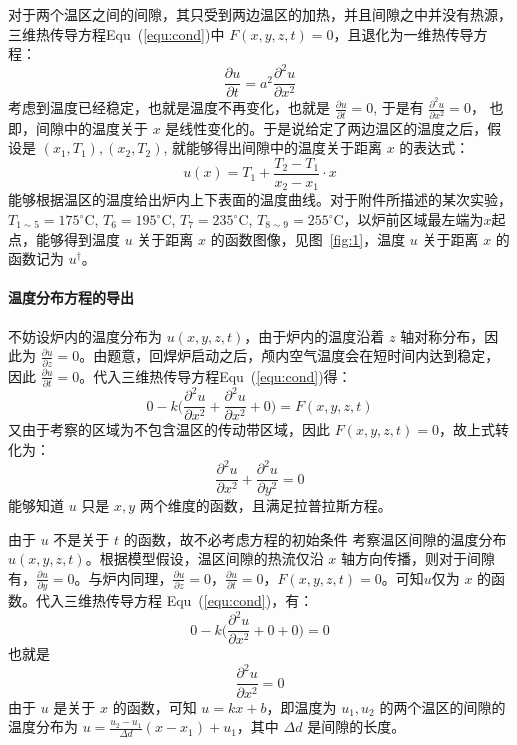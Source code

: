 \documentclass[../main.tex]{subfiles}
\begin{document}
对于两个温区之间的间隙，其只受到两边温区的加热，并且间隙之中并没有热源，三维热传导方程Equ~(\ref{equ:cond})中 \(F ( x , y , z ,t) = 0\)，且退化为一维热传导方程：
\begin{equation}
\frac{\partial u}{\partial t} = a^{2} \frac{\partial ^{2} u}{ \partial x ^{2}}
\end{equation}
考虑到温度已经稳定，也就是温度不再变化，也就是 \(\frac{\partial u}{ \partial t} = 0\), 于是有 \(\frac{\partial ^{2} u}{\partial x ^{2}} = 0 \)，
也即，间隙中的温度关于 \(x\) 是线性变化的。于是说给定了两边温区的温度之后，假设是 \((x_1, T_1), (x_2, T_2)\), 就能够得出间隙中的温度关于距离 \(x\) 的表达式：
\[
u(x)  = T_{1} + \frac{T_2 - T_1}{x_2 - x_1} \cdot x
\]
能够根据温区的温度给出炉内上下表面的温度曲线。对于附件所描述的某次实验，\(T _{1 \sim 5} = 17 5 ^{\circ}\mathrm{C}\), \(T _{6} = 195 ^{\circ}\mathrm{C}\), \(T _{7} = 235 ^{\circ}\mathrm{C}\), \(T _{8 \sim 9} = 255 ^{\circ}\mathrm{C}\)，以炉前区域最左端为\(x\)起点，能够得到温度 \(u\) 关于距离 \(x\) 的函数图像，见图~\ref{fig:1}，温度 \(u\) 关于距离 \(x\) 的函数记为 \(u ^{\dagger}\)。


\paragraph{温度分布方程的导出}
不妨设炉内的温度分布为 \(u ( x,  y  ,z ,t)\)，由于炉内的温度沿着 \(z\) 轴对称分布，因此为 \(\frac{\partial u}{ \partial z} = 0\)。由题意，回焊炉启动之后，颅内空气温度会在短时间内达到稳定，因此 \( \frac{\partial u}{ \partial t} = 0\)。代入三维热传导方程Equ~(\ref{equ:cond})得：
\begin{equation}
0 - k \bigg( \frac{\partial ^{2} u }{\partial x ^{2}} + \frac{\partial ^{2} u}{\partial x ^{2}} + 0\bigg) = F (x , y, z , t)
\end{equation}
又由于考察的区域为不包含温区的传动带区域，因此 \(F (x, y , z , t) = 0\)，故上式转化为：
\begin{equation}
\frac{\partial ^{2} u}{\partial x ^{2}} + \frac{\partial ^{2} u}{\partial y ^{2}} = 0
\end{equation}
能够知道 \(u\) 只是 \(x , y\) 两个维度的函数，且满足拉普拉斯方程。

由于 \(u\) 不是关于 \(t\) 的函数，故不必考虑方程的初始条件
考察温区间隙的温度分布 \(u (x,  y , z ,t)\)。根据模型假设，温区间隙的热流仅沿 \(x\) 轴方向传播，则对于间隙有，\(\frac{\partial u}{\partial y} = 0\)。与炉内同理，\(\frac{\partial u}{ \partial z} = 0\)，\(\frac{\partial u}{\partial t} = 0\)，\(F(x, y , z,t) = 0\)。可知\(u\)仅为 \(x\) 的函数。代入三维热传导方程 Equ~(\ref{equ:cond})，有：
\begin{equation}
0 - k \bigg( \frac{\partial ^{2} u}{ \partial x ^{2}} + 0 + 0\bigg) = 0
\end{equation}
也就是 
\begin{equation}
\frac{\partial ^{2} u}{\partial x ^{2}} = 0
\end{equation}
由于 \(u\) 是关于 \(x\) 的函数，可知 \(u = kx + b\)，即温度为 \(u_{1} , u_2\) 的两个温区的间隙的温度分布为 \(u = \displaystyle \frac{u_2 - u_1}{\varDelta d} ( x - x_1) + u_1\)，其中 \(\varDelta d\) 是间隙的长度。
\end{document}
